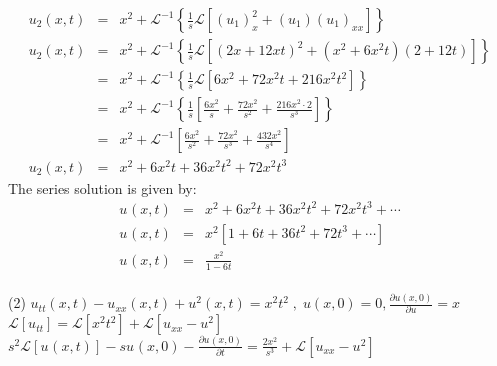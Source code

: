 \documentclass[12pt]{report}
\newcommand{\Laplace}{\mathcal{L}}
\newcommand{\Un}[2]{u_{#1}(#2)}
\newcommand{\NI}{\noindent}
\newcommand{\InverseL}[1]{\Laplace^{-1}\left[#1\right]}
\newcommand{\LT}[1]{\Laplace \left[#1\right]}
\newcommand{\Unx}[1]{\Un{#1}{x,t}}
\newcommand{\InverseLx}[1]{\Laplace^{-1}\left\{ #1 \right\}}
\newcommand{\Usub}[1]{u_{#1}}
\newcommand{\Usup}[1]{u^{#1}}
\begin{document}
\begin{eqnarray}
\Unx{2} &=& x^2 + \InverseLx{\frac{1}{s}\LT{\left(u_{1}\right)_{x}^{2} + \left(u_{1}\right)\left(u_{1}\right)_{xx}}}\nonumber    \\[0.1cm]
\Unx{2} &=& x^2 + \InverseLx{\frac{1}{s}\LT{(2x + 12xt)^2 + (x^2 + 6x^{2}t)(2+12t)}} \nonumber\\[0.1cm]
&=& x^2 + \InverseLx{\frac{1}{s}\LT{6x^2 + 72x^2t + 216x^2t^2}} \nonumber\\[0.1cm]
&=& x^2 + \InverseLx{\frac{1}{s}\left[\frac{6x^2}{s} + \frac{72x^2}{s^2} + \frac{216x^2 \cdot 2}{s^3} \right]}\nonumber \\
&=& x^2 + \InverseL{\frac{6x^2}{s^2} + \frac{72x^2}{s^3} + \frac{432x^2}{s^4}}\nonumber\\[0.3cm]
\Unx{2} &=& x^2 + 6x^2t + 36x^2t^2 + 72x^2t^3
\end{eqnarray}
The series solution is given by:
\begin{eqnarray*}
\Unx{} &=& x^2 + 6x^2t + 36x^2t^2 + 72x^2t^3 + \cdots\\[0.25cm]
\Unx{} &=& x^2\left[1+6t + 36t^2 + 72t^3 + \cdots \right] \\[0.27cm]
\Unx{} &=& \frac{x^2}{1-6t}\\
\label{eq:}
\end{eqnarray*}

\NI (2) $\displaystyle\Unx{tt} - \Unx{xx} + u^{2}(x,t) = x^2t^2 \; , \; u(x,0) = 0, \frac{\partial u(x,0)}{\partial u} = x 
$\\[0.4cm]
$\displaystyle
 \LT{u_{tt}} = \LT{x^2t^2} + \LT{u_{xx} - u^2}
$\\[0.2cm]
$\displaystyle
s^2 \LT{\Unx{}} - s\Un{}{x,0} - \frac{\partial \Un{}{x,0}}{\partial t} = \frac{2x^2}{s^3} + \LT{\Usub{xx} - \Usup{2}}
$\\[0.2cm]
\end{document}
